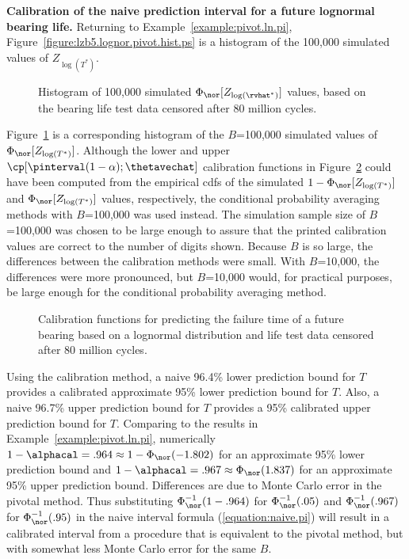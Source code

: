 \begin{example}
{\bf Calibration of the naive prediction interval for a future
lognormal bearing life.}
Returning to Example~\ref{example:pivot.ln.pi},
Figure~\ref{figure:lzb5.lognor.pivot.hist.ps} is a histogram
of the 100,000 simulated values of $Z_{\log(T^{*})}$.
\begin{figure}
\caption{Histogram of 100,000 simulated $\Phi_{\nor}[Z_{\log(\rvhat^{*})}]$
values, based on the bearing life test data censored after 80
million cycles.}
\label{figure:lzb5.lognor.phi.hn.hist.ps}
\end{figure}
Figure~\ref{figure:lzb5.lognor.phi.hn.hist.ps} is a corresponding
histogram of the $B$=100,000 simulated values of
$\Phi_{\nor}[Z_{\log(T^{*})}]$.  Although the lower and upper
$\cp[\pinterval(1-\alpha) ;\thetavechat]$ calibration functions in
Figure~\ref{figure:lzb5.predict.calibration.ps} could have been
computed from the empirical cdfs of the simulated
$1-\Phi_{\nor}[Z_{\log(T^{*})}]$ and $\Phi_{\nor}[Z_{\log(T^{*})}]$
values, respectively, the conditional probability averaging methods
with $B$=100,000 was used instead. The simulation sample size of
$B$=100,000 was chosen to be large enough to assure that the printed
calibration values are correct to the number of digits shown.
Because $B$ is so large, the differences between the calibration
methods were small. With $B$=10,000, the differences were more
pronounced, but $B$=10,000 would, for practical purposes, be large
enough for the conditional probability averaging method.
\begin{figure}
\caption{Calibration functions for predicting 
the failure time of a future bearing based on a lognormal
distribution and life test data censored after 80 million cycles.}
\label{figure:lzb5.predict.calibration.ps}
\end{figure}
Using the calibration method, a naive 96.4\% lower prediction
bound for $T$ provides a calibrated approximate 95\% lower
prediction bound for $T$.  Also, a naive 96.7\% upper prediction
bound for $T$ provides a 95\% calibrated upper prediction bound for
$T$. Comparing to the results in Example~\ref{example:pivot.ln.pi},
numerically $1-\alphacal=.964 \approx
1-\Phi_{\nor}(-1.802)$ for an approximate 95\% lower
prediction bound and $1-\alphacal= .967 \approx
\Phi_{\nor}(1.837)$ for an approximate 95\% upper prediction
bound. Differences are due to Monte Carlo error in the pivotal
method. Thus substituting $\Phi^{-1}_{\nor}(1-.964)$ for
$\Phi^{-1}_{\nor}(.05)$ and $\Phi^{-1}_{\nor}(.967)$ for
$\Phi^{-1}_{\nor}(.95)$ in the naive interval formula
(\ref{equation:naive.pi}) will result in a calibrated interval from
a procedure that is equivalent to the pivotal method, but with
somewhat less Monte Carlo error for the same $B$.
\end{example}

